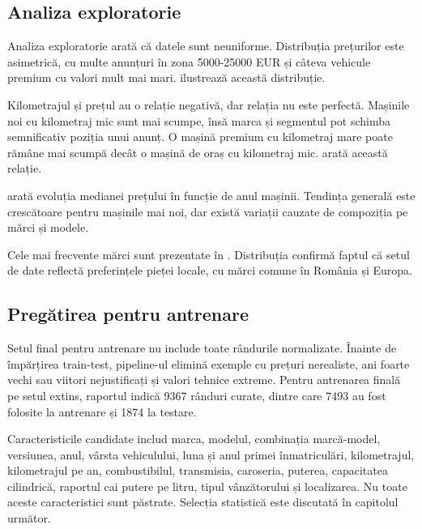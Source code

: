 \subsection{Analiza exploratorie}
\label{sec:data-eda}

Analiza exploratorie arată că datele sunt neuniforme. Distribuția prețurilor este asimetrică, cu multe anunțuri în zona 5000-25000 EUR și câteva vehicule premium cu valori mult mai mari.  ilustrează această distribuție.


Kilometrajul și prețul au o relație negativă, dar relația nu este perfectă. Mașinile noi cu kilometraj mic sunt mai scumpe, însă marca și segmentul pot schimba semnificativ poziția unui anunț. O mașină premium cu kilometraj mare poate rămâne mai scumpă decât o mașină de oraș cu kilometraj mic.  arată această relație.


 arată evoluția medianei prețului în funcție de anul mașinii. Tendința generală este crescătoare pentru mașinile mai noi, dar există variații cauzate de compoziția pe mărci și modele.


Cele mai frecvente mărci sunt prezentate în . Distribuția confirmă faptul că setul de date reflectă preferințele pieței locale, cu mărci comune în România și Europa.


\subsection{Pregătirea pentru antrenare}
\label{sec:data-training-ready}

Setul final pentru antrenare nu include toate rândurile normalizate. Înainte de împărțirea train-test, pipeline-ul elimină exemple cu prețuri nerealiste, ani foarte vechi sau viitori nejustificați și valori tehnice extreme. Pentru antrenarea finală pe setul extins, raportul indică 9367 rânduri curate, dintre care 7493 au fost folosite la antrenare și 1874 la testare.

Caracteristicile candidate includ marca, modelul, combinația marcă-model, versiunea, anul, vârsta vehiculului, luna și anul primei înmatriculări, kilometrajul, kilometrajul pe an, combustibilul, transmisia, caroseria, puterea, capacitatea cilindrică, raportul cai putere pe litru, tipul vânzătorului și localizarea. Nu toate aceste caracteristici sunt păstrate. Selecția statistică este discutată în capitolul următor.
